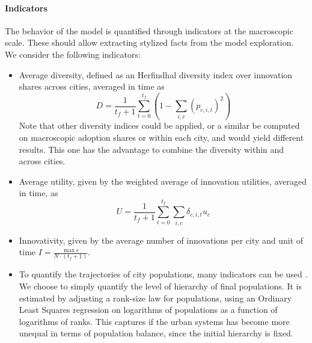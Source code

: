 \documentclass[letterpaper]{article}
\begin{document}
\paragraph{Indicators}


The behavior of the model is quantified through indicators at the macroscopic scale. These should allow extracting stylized facts from the model exploration. We consider the following indicators:
\begin{itemize}
	\item Average diversity, defined as an Herfindhal diversity index over innovation shares across cities, averaged in time as
	\begin{equation}
		D = \frac{1}{t_f + 1} \sum_{t=0}^{t_f} \left(1 - \sum_{i,c} \left(p_{c,i,t}\right)^2 \right)	
	\end{equation}
	Note that other diversity indices could be applied, or a similar be computed on macroscopic adoption shares or within each city, and would yield different results. This one has the advantage to combine the diversity within and across cities.
	\item Average utility, given by the weighted average of innovation utilities, averaged in time, as
	\begin{equation}
		U = \frac{1}{t_f + 1} \sum_{t=0}^{t_f} \sum_{i,c} \delta_{c,i,t} u_c 
	\end{equation}
	\item Innovativity, given by the average number of innovations per city and unit of time $I = \frac{\max c}{N\cdot (t_f + 1)}$.
	\item To quantify the trajectories of city populations, many indicators can be used \citep{raimbault2020unveiling}. We choose to simply quantify the level of hierarchy of final populations. It is estimated by adjusting a rank-size law for populations, using an Ordinary Least Squares regression on logarithms of populations as a function of logarithms of ranks. This captures if the urban systems has become more unequal in terms of population balance, since the initial hierarchy is fixed.
\end{itemize}
\end{document}
